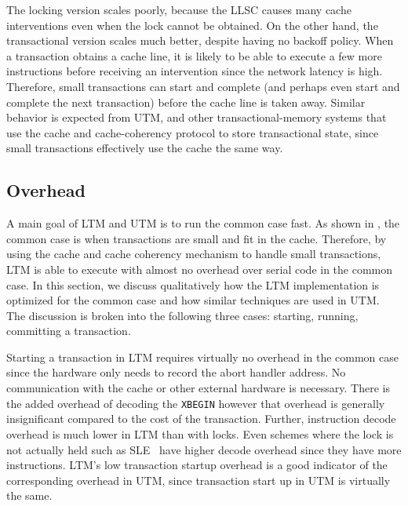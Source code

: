 The locking version scales poorly, because the LLSC causes many cache
interventions even when the lock cannot be obtained. On the other
hand, the transactional version scales much better, despite having no
backoff policy.  When a transaction obtains a cache line, it is likely
to be able to execute a few more instructions before receiving an
intervention since the network latency is high.  Therefore, small
transactions can start and complete (and perhaps even start and
complete the next transaction) before the cache line is taken away.
Similar behavior is expected from UTM, and other transactional-memory
systems that use the cache and cache-coherency protocol to store
transactional state, since small transactions effectively use the
cache the same way. 

\subsection{Overhead}

A main goal of LTM and UTM is to run the common case fast. As shown in
, the common case is when transactions are small
and fit in the cache. Therefore, by using the cache and cache
coherency mechanism to handle small transactions, LTM is able to
execute with almost no overhead over serial code in the common
case. In this section, we discuss qualitatively how the LTM
implementation is optimized for the common case and how similar
techniques are used in UTM\@. The discussion is broken into the
following three cases: starting, running, committing a transaction.

Starting a transaction in LTM requires virtually no overhead in the
common case since the hardware only needs to record the abort handler
address. No communication with the cache or other external hardware is
necessary. There is the added overhead of decoding the \texttt{XBEGIN}
however that overhead is generally insignificant compared to the cost
of the transaction. Further, instruction decode overhead is much lower
in LTM than with locks. Even schemes where the lock is not actually
held such as SLE~\cite{RajwarGo01} have higher decode overhead since they have more
instructions. LTM's low transaction startup overhead is a good
indicator of the corresponding overhead in UTM, since transaction start
up in UTM is virtually the same.

